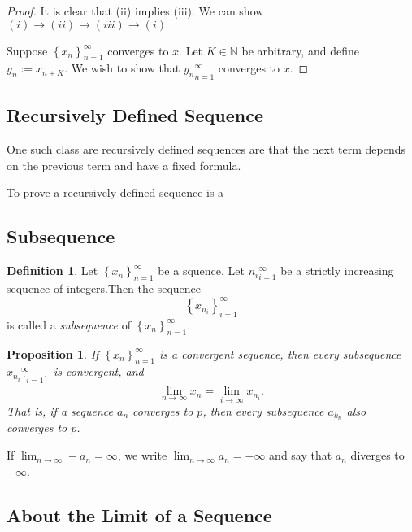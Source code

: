 \documentclass{article}
\newtheorem{prop}[theorem]{Proposition}
\theoremstyle{definition}
\newtheorem{defi}{Definition}[section]
\begin{document}
\begin{proof}
It is clear that (ii) implies (iii). We can show $(i)\to (ii)\to (iii)\to (i)$

Suppose $\left\{x_{n}\right\}_{n=1}^{\infty}$ converges to $x$. Let $K\in \mathbb{N}$ be arbitrary, and define $y_{n}:=x_{n+K}$. We wish to show that ${y_{n}}_{n=1}^{\infty}$ converges to $x$.
\end{proof}

\subsection{Recursively Defined Sequence}

One such class are recursively defined sequences are that the next term depends on the previous term and have a fixed formula.

To prove a recursively defined sequence is a 



\subsection{Subsequence}

\begin{defi}
    Let $\left\{x_{n}\right\}_{n=1}^{\infty}$ be a squence. Let ${n_{i}}_{i=1}^{\infty}$ be a strictly increasing sequence of integers.Then the sequence 
    $$\left\{x_{n_{i}}\right\}_{i=1}^{\infty}$$ is called a \textit{subsequence} of $\left\{x_{n}\right\}_{n=1}^{\infty}$.
\end{defi}


\begin{prop}
    If $\left\{x_{n}\right\}_{n=1}^{\infty}$ is a convergent sequence, then every subsequence ${x_{n_{i}}}_[i=1]^{\infty}$ is convergent, and 
    $$\lim_{n\to \infty}x_{n}=\lim_{i\to \infty}x_{n_{i}}.$$ 
    That is, if a sequence ${a_{n}}$ converges to $p$, then every subsequence ${a_{k_{n}}}$ also converges to $p$.

\end{prop}



If $\lim_{n\rightarrow\infty}-a_{n}=\infty$, we write $\lim_{n\rightarrow\infty}a_{n}=-\infty$ and say that $a_{n}$ 
diverges to $-\infty$. 


\subsection{About the Limit of a Sequence}
\end{document}
